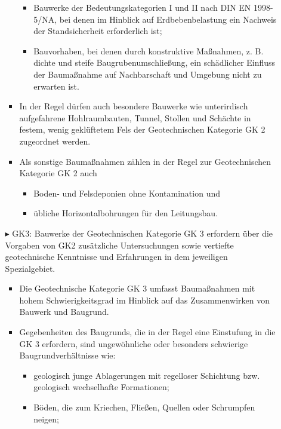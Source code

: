 \documentclass[fleqn,twoside]{article}
\begin{document}
\begin{itemize}
\begin{itemize}
\begin{itemize}
\begin{itemize}
                                \item Bauwerke der Bedeutungskategorien I und II nach DIN EN 1998-5/NA, bei denen im Hinblick auf                 Erdbebenbelastung ein Nachweis der Standsicherheit erforderlich ist;
                                \item Bauvorhaben, bei denen durch konstruktive Maßnahmen, z. B. dichte und steife                 Baugrubenumschließung, ein schädlicher Einfluss der Baumaßnahme auf Nachbarschaft und Umgebung                 nicht zu erwarten ist.
                            \end{itemize}
                        \item In der Regel dürfen auch besondere Bauwerke wie unterirdisch aufgefahrene Hohlraumbauten, Tunnel, Stollen und Schächte in festem, wenig geklüftetem Fels der Geotechnischen Kategorie GK 2 zugeordnet werden.
                        \item Als sonstige Baumaßnahmen zählen in der Regel zur Geotechnischen Kategorie GK 2 auch
                            \begin{itemize}
                                \item Boden- und Felsdeponien ohne Kontamination und
                                \item übliche Horizontalbohrungen für den Leitungsbau.
                            \end{itemize}
                    \end{itemize}
                $\blacktriangleright$ GK3: Bauwerke der Geotechnischen Kategorie GK 3 erfordern über die Vorgaben von GK2 zusätzliche Untersuchungen sowie vertiefte geotechnische Kenntnisse und Erfahrungen in dem jeweiligen Spezialgebiet.
                    \begin{itemize}
                        \item Die Geotechnische Kategorie GK 3 umfasst Baumaßnahmen mit hohem Schwierigkeitsgrad im Hinblick auf das Zusammenwirken von Bauwerk und Baugrund.
                        \item Gegebenheiten des Baugrunds, die in der Regel eine Einstufung in die GK 3 erfordern, sind ungewöhnliche oder besonders schwierige Baugrundverhältnisse wie:
                            \begin{itemize}
                                \item geologisch junge Ablagerungen mit regelloser Schichtung bzw. geologisch wechselhafte Formationen;
                                \item Böden, die zum Kriechen, Fließen, Quellen oder Schrumpfen neigen;

\end{itemize}
\end{itemize}
\end{itemize}
\end{itemize}
\end{document}
